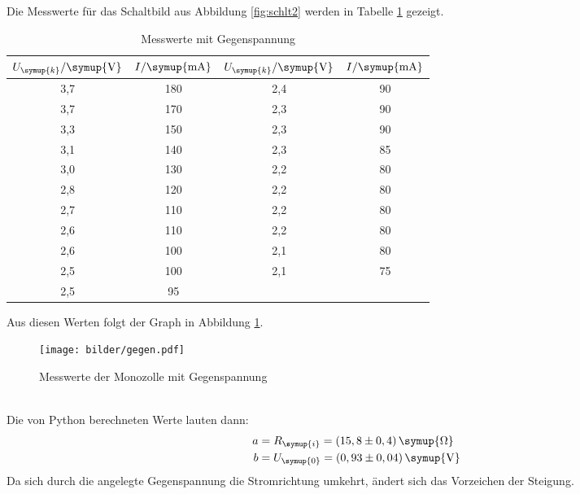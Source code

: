 \newpage
Die Messwerte für das Schaltbild aus Abbildung \ref{fig:schlt2} werden in
Tabelle \ref{tab:ggn} gezeigt.
\begin{table}[H]
  \centering
  \begin{tabular}{c c c c}
    \toprule
    $U_{\symup{k}}/\symup{\si{\volt}}$ & $I/\symup{\si{\milli\ampere}}$  &
    $U_{\symup{k}}/\symup{\si{\volt}}$ & $I/\symup{\si{\milli\ampere}}$  \\
    \midrule
    3,7  &  180  &  2,4  &  90  \\
    3,7  &  170  &  2,3  &  90  \\
    3,3  &  150  &  2,3  &  90  \\
    3,1  &  140  &  2,3  &  85  \\
    3,0  &  130  &  2,2  &  80  \\
    2,8  &  120  &  2,2  &  80  \\
    2,7  &  110  &  2,2  &  80  \\
    2,6  &  110  &  2,2  &  80  \\
    2,6  &  100  &  2,1  &  80  \\
    2,5  &  100  &  2,1  &  75  \\
    2,5  &   95  &  \hrulefill  &  \hrulefill \\
    \bottomrule
  \end{tabular}
  \caption{Messwerte mit Gegenspannung}
  \label{tab:ggn}
\end{table}
Aus diesen Werten folgt der Graph in Abbildung \ref{fig:ggn}.
\begin{figure}
  \centering
  \texttt{[image: bilder/gegen.pdf]}
  \caption{Messwerte der Monozolle mit Gegenspannung}
  \label{fig:ggn}
\end{figure}
\\
Die von Python berechneten Werte lauten dann:
\begin{align*}
   a &= R_\symup{i} = (15,8 \pm 0,4)\, \symup{\si{\ohm}} \\ %
   b &= U_\symup{0} = (0,93 \pm 0,04)\,\symup{\si{\volt}}
\end{align*}
Da sich durch die angelegte Gegenspannung die Stromrichtung umkehrt, ändert sich
das Vorzeichen der Steigung.
\newpage

